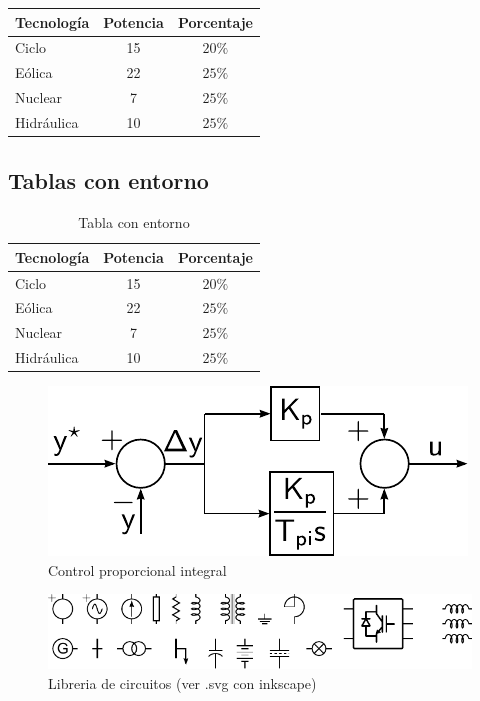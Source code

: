 \begin{tabular}{lcc}
\toprule
Tecnología & Potencia & Porcentaje \\ 
\midrule
Ciclo  & 15 & $20\%$ \\ 
Eólica & 22 & $25\%$ \\ 
Nuclear & 7 & $25\%$ \\ 
Hidráulica & 10 & $25\%$ \\ 
\bottomrule
\end{tabular} 

\subsection{Tablas con entorno}

\begin{table}
\centering
\begin{tabular}{lcc}
\toprule
Tecnología & Potencia & Porcentaje \\ 
\midrule
Ciclo  & 15 & $20\%$ \\ 
Eólica & 22 & $25\%$ \\ 
Nuclear & 7 & $25\%$ \\ 
Hidráulica & 10 & $25\%$ \\ 
\bottomrule
\end{tabular} 

\caption{Tabla con entorno}
\label{tbl:nombre_tabla}
\end{table}


 
\begin{figure}
	\includegraphics[width=\textwidth]{model/pdf/pi.pdf} 
	\caption{Control proporcional integral}
	\label{ctrl_pi}
\end{figure}
 
 
\begin{figure}
	\includegraphics[width=\textwidth]{./pdf/circuitos.pdf} 
	\caption{Libreria de circuitos (ver .svg con inkscape)}
	\label{fig:circuitos}
\end{figure}

 \cite{Rodriguez2007}
 
 
 
 

